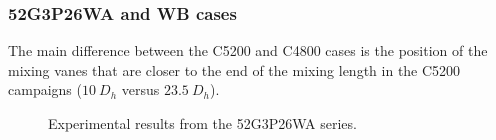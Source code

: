 \subsubsection{52G3P26WA and WB cases}


The main difference between the C5200 and C4800 cases is the position of the mixing vanes that are closer to the end of the mixing length in the C5200 campaigns ($10\ D_{h}$ versus $23.5\ D_{h}$).

\begin{figure}[!h]
\centering
{}

\caption{Experimental results from the 52G3P26WA series.}
\label{fig:exp_52G3P26W23}
\end{figure}


